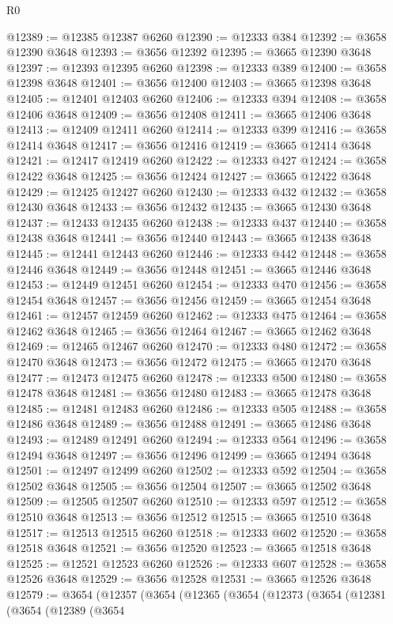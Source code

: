 \begin{lexlean}{R0}
\begin{coremodule}
@12389 := @12385 @12387 @6260
@12390 := @12333 @384
@12392 := @3658 @12390 @3648
@12393 := @3656 @12392
@12395 := @3665 @12390 @3648
@12397 := @12393 @12395 @6260
@12398 := @12333 @389
@12400 := @3658 @12398 @3648
@12401 := @3656 @12400
@12403 := @3665 @12398 @3648
@12405 := @12401 @12403 @6260
@12406 := @12333 @394
@12408 := @3658 @12406 @3648
@12409 := @3656 @12408
@12411 := @3665 @12406 @3648
@12413 := @12409 @12411 @6260
@12414 := @12333 @399
@12416 := @3658 @12414 @3648
@12417 := @3656 @12416
@12419 := @3665 @12414 @3648
@12421 := @12417 @12419 @6260
@12422 := @12333 @427
@12424 := @3658 @12422 @3648
@12425 := @3656 @12424
@12427 := @3665 @12422 @3648
@12429 := @12425 @12427 @6260
@12430 := @12333 @432
@12432 := @3658 @12430 @3648
@12433 := @3656 @12432
@12435 := @3665 @12430 @3648
@12437 := @12433 @12435 @6260
@12438 := @12333 @437
@12440 := @3658 @12438 @3648
@12441 := @3656 @12440
@12443 := @3665 @12438 @3648
@12445 := @12441 @12443 @6260
@12446 := @12333 @442
@12448 := @3658 @12446 @3648
@12449 := @3656 @12448
@12451 := @3665 @12446 @3648
@12453 := @12449 @12451 @6260
@12454 := @12333 @470
@12456 := @3658 @12454 @3648
@12457 := @3656 @12456
@12459 := @3665 @12454 @3648
@12461 := @12457 @12459 @6260
@12462 := @12333 @475
@12464 := @3658 @12462 @3648
@12465 := @3656 @12464
@12467 := @3665 @12462 @3648
@12469 := @12465 @12467 @6260
@12470 := @12333 @480
@12472 := @3658 @12470 @3648
@12473 := @3656 @12472
@12475 := @3665 @12470 @3648
@12477 := @12473 @12475 @6260
@12478 := @12333 @500
@12480 := @3658 @12478 @3648
@12481 := @3656 @12480
@12483 := @3665 @12478 @3648
@12485 := @12481 @12483 @6260
@12486 := @12333 @505
@12488 := @3658 @12486 @3648
@12489 := @3656 @12488
@12491 := @3665 @12486 @3648
@12493 := @12489 @12491 @6260
@12494 := @12333 @564
@12496 := @3658 @12494 @3648
@12497 := @3656 @12496
@12499 := @3665 @12494 @3648
@12501 := @12497 @12499 @6260
@12502 := @12333 @592
@12504 := @3658 @12502 @3648
@12505 := @3656 @12504
@12507 := @3665 @12502 @3648
@12509 := @12505 @12507 @6260
@12510 := @12333 @597
@12512 := @3658 @12510 @3648
@12513 := @3656 @12512
@12515 := @3665 @12510 @3648
@12517 := @12513 @12515 @6260
@12518 := @12333 @602
@12520 := @3658 @12518 @3648
@12521 := @3656 @12520
@12523 := @3665 @12518 @3648
@12525 := @12521 @12523 @6260
@12526 := @12333 @607
@12528 := @3658 @12526 @3648
@12529 := @3656 @12528
@12531 := @3665 @12526 @3648
@12579 := @3654
    (@12357
      (@3654
        (@12365
          (@3654
            (@12373
              (@3654
                (@12381
                  (@3654
                    (@12389
                      (@3654

\end{coremodule}
\end{lexlean}
